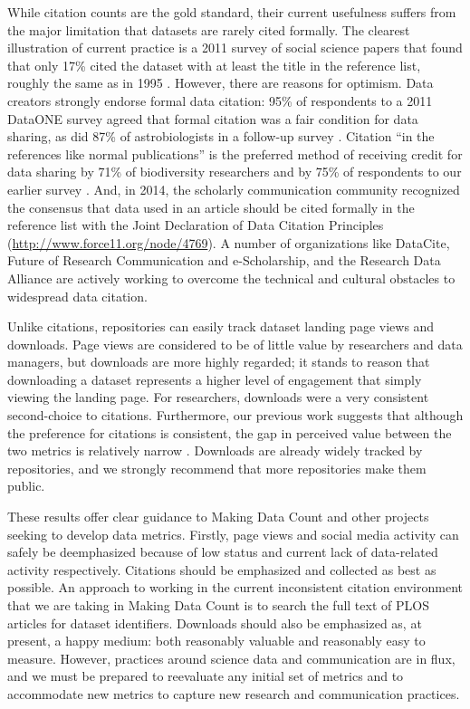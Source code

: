 \documentclass[english]{article}
\begin{document}

While citation counts are the gold standard, their current usefulness suffers from the major limitation that datasets are rarely cited formally.
The clearest illustration of current practice is a 2011 survey of social science papers that found that only 17\% cited the dataset with at least the title in the reference list, roughly the same as in 1995 \cite{sieber_not_1995, mooney_citing_2011}. 
However, there are reasons for optimism.
Data creators strongly endorse formal data citation: 95\% of respondents to a 2011 DataONE survey agreed that formal citation was a fair condition for data sharing, as did 87\% of astrobiologists in a follow-up survey \cite{tenopir_data_2011, aydinoglu_data_2014}. 
Citation ``in the references like normal publications'' is the preferred method of receiving credit for data sharing by 71\% of biodiversity researchers and by 75\% of respondents to our earlier survey \cite{enke_users_2012, kratz_researcher_2015}.
And, in 2014, the scholarly communication community recognized the consensus that data used in an article should be cited formally in the reference list with the Joint Declaration of Data Citation Principles (\url{http://www.force11.org/node/4769}).
A number of organizations like DataCite, Future of Research Communication and e-Scholarship, and the Research Data Alliance are actively working to overcome the technical and cultural obstacles to widespread data citation.

Unlike citations, repositories can easily track dataset landing page views and downloads.
Page views are considered to be of little value by researchers and data managers, but downloads are more highly regarded; it stands to reason that downloading a dataset represents a higher level of engagement that simply viewing the landing page.
For researchers, downloads were a very consistent second-choice to citations.
Furthermore, our previous work suggests that although the preference for citations is consistent, the gap in perceived value between the two metrics is relatively narrow \cite{kratz_researcher_2015}.
Downloads are already widely tracked by repositories, and we strongly recommend that more repositories make them public.

These results offer clear guidance to Making Data Count and other projects seeking to develop data metrics.
Firstly, page views and social media activity can safely be deemphasized because of low status and current lack of data-related activity respectively.
Citations should be emphasized and collected as best as possible.
An approach to working in the current inconsistent citation environment that we are taking in Making Data Count is to search the full text of PLOS articles for dataset identifiers.
Downloads should also be emphasized as, at present, a happy medium: both reasonably valuable and reasonably easy to measure.
However, practices around science data and communication are in flux, and we must be prepared to reevaluate any initial set of metrics and to accommodate new metrics to capture new research and communication practices.
\end{document}
